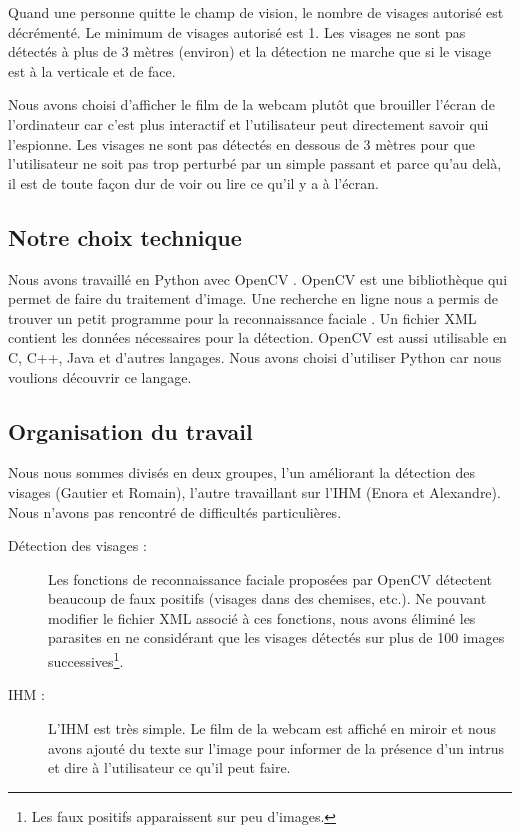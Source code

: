 \documentclass[11pt]{article}
\begin{document}
Quand une personne quitte le champ de vision, le nombre de visages autorisé est décrémenté. Le minimum de visages autorisé est 1. Les visages ne sont pas détectés à plus de 3 mètres (environ) et la détection ne marche que si le visage est à la verticale et de face.

Nous avons choisi d'afficher le film de la webcam plutôt que brouiller l'écran de l'ordinateur car c'est plus interactif et l'utilisateur peut directement savoir qui l'espionne. Les visages ne sont pas détectés en dessous de 3 mètres pour que l'utilisateur ne soit pas trop perturbé par un simple passant et parce qu'au delà, il est de toute façon dur de voir ou lire ce qu'il y a à l'écran.

\subsection{Notre choix technique}

Nous avons travaillé en Python avec OpenCV \cite{install_opencv}. OpenCV est une bibliothèque qui permet de faire du traitement d'image. Une recherche en ligne nous a permis de trouver un petit programme pour la reconnaissance faciale \cite{prog}. Un fichier XML \cite{xml} contient les données nécessaires pour la détection. OpenCV est aussi utilisable en C, C++, Java et d'autres langages. Nous avons choisi  d'utiliser Python car nous voulions découvrir ce langage.

\subsection{Organisation du travail}

Nous nous sommes divisés en deux groupes, l'un améliorant la détection des visages (Gautier et Romain), l'autre travaillant sur l'IHM (Enora et Alexandre). Nous n'avons pas rencontré de difficultés particulières.

\begin{description}
\item[Détection des visages :] Les fonctions de reconnaissance faciale proposées par OpenCV détectent beaucoup de faux positifs (visages dans des chemises, etc.). Ne pouvant modifier le fichier XML associé à ces fonctions, nous avons éliminé les parasites en ne considérant que les visages détectés sur plus de 100 images successives\footnote{Les faux positifs apparaissent sur peu d'images.}. 
\item[IHM :] L'IHM est très simple. Le film de la webcam est affiché en miroir et nous avons ajouté du texte sur l'image pour informer de la présence d'un intrus et dire à l'utilisateur ce qu'il peut faire.
\end{description}
\end{document}
